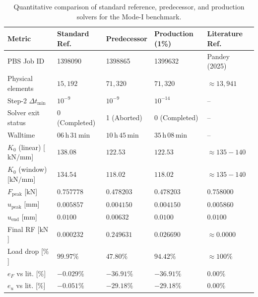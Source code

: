 \begin{table}[htbp]
\centering
\caption{Quantitative comparison of standard reference, predecessor, and production solvers for the Mode-I benchmark.}
\label{tab:task5_solver_metrics}
\footnotesize
\begin{tabular}{p{}p{}p{}p{}p{}}
\toprule
Metric & Standard Ref. & Predecessor & Production (1\%) & Literature Ref. \\
\midrule
PBS Job ID & 1398090 & 1398865 & 1399632 & Pandey (2025) \\
Physical elements & $15{,}192$ & $71{,}320$ & $71{,}320$ & $\approx 13{,}941$ \\
Step-2 $\Delta t_{\min}$ & $10^{-9}$ & $10^{-9}$ & $10^{-14}$ & -- \\
Solver exit status & 0 (Completed) & 1 (Aborted) & 0 (Completed) & -- \\
Walltime & $06\,\mathrm{h}\,31\,\mathrm{min}$ & $10\,\mathrm{h}\,45\,\mathrm{min}$ & $35\,\mathrm{h}\,08\,\mathrm{min}$ & -- \\
\midrule
$K_0$ (linear) [$\mathrm{kN/mm}$] & $138.08$ & $122.53$ & $122.53$ & $\approx 135 - 140$ \\
$K_0$ (window) [$\mathrm{kN/mm}$] & $134.54$ & $118.02$ & $118.02$ & $\approx 135 - 140$ \\
$F_{\text{peak}}$ [$\mathrm{kN}$] & $0.757778$ & $0.478203$ & $0.478203$ & $0.758000$ \\
$u_{\text{peak}}$ [$\mathrm{mm}$] & $0.005857$ & $0.004150$ & $0.004150$ & $0.005860$ \\
$u_{\text{end}}$ [$\mathrm{mm}$] & $0.0100$ & $0.00632$ & $0.0100$ & $0.0100$ \\
Final RF [$\mathrm{kN}$] & $0.000232$ & $0.249631$ & $0.026690$ & $\approx 0.0000$ \\
Load drop [$\%$] & $99.97\%$ & $47.80\%$ & $94.42\%$ & $\approx 100\%$ \\
$e_F$ vs lit. [$\%$] & $-0.029\%$ & $-36.91\%$ & $-36.91\%$ & $0.00\%$ \\
$e_u$ vs lit. [$\%$] & $-0.051\%$ & $-29.18\%$ & $-29.18\%$ & $0.00\%$ \\
\bottomrule
\end{tabular}
\end{table}

